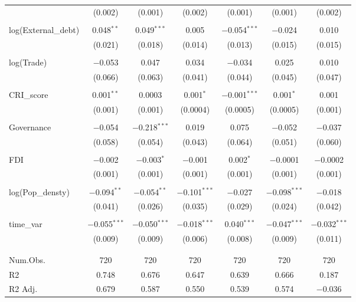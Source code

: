 \begin{table}[!htbp]
\begin{tabular}{@{\extracolsep{-3pt}}lcccccc}
  & (0.002) & (0.001) & (0.002) & (0.001) & (0.001) & (0.002) \\ 
  & & & & & & \\ 
 log(External\_debt) & 0.048$^{**}$ & 0.049$^{***}$ & 0.005 & $-$0.054$^{***}$ & $-$0.024 & 0.010 \\ 
  & (0.021) & (0.018) & (0.014) & (0.013) & (0.015) & (0.015) \\ 
  & & & & & & \\ 
 log(Trade) & $-$0.053 & 0.047 & 0.034 & $-$0.034 & 0.025 & 0.010 \\ 
  & (0.066) & (0.063) & (0.041) & (0.044) & (0.045) & (0.047) \\ 
  & & & & & & \\ 
 CRI\_score & 0.001$^{**}$ & 0.0003 & 0.001$^{*}$ & $-$0.001$^{***}$ & 0.001$^{*}$ & 0.001 \\ 
  & (0.001) & (0.001) & (0.0004) & (0.0005) & (0.0005) & (0.001) \\ 
  & & & & & & \\ 
 Governance & $-$0.054 & $-$0.218$^{***}$ & 0.019 & 0.075 & $-$0.052 & $-$0.037 \\ 
  & (0.058) & (0.054) & (0.043) & (0.064) & (0.051) & (0.060) \\ 
  & & & & & & \\ 
 FDI & $-$0.002 & $-$0.003$^{*}$ & $-$0.001 & 0.002$^{*}$ & $-$0.0001 & $-$0.0002 \\ 
  & (0.001) & (0.001) & (0.001) & (0.001) & (0.001) & (0.001) \\ 
  & & & & & & \\ 
 log(Pop\_densty) & $-$0.094$^{**}$ & $-$0.054$^{**}$ & $-$0.101$^{***}$ & $-$0.027 & $-$0.098$^{***}$ & $-$0.018 \\ 
  & (0.041) & (0.026) & (0.035) & (0.029) & (0.024) & (0.042) \\ 
  & & & & & & \\ 
 time\_var & $-$0.055$^{***}$ & $-$0.050$^{***}$ & $-$0.018$^{***}$ & 0.040$^{***}$ & $-$0.047$^{***}$ & $-$0.032$^{***}$ \\ 
  & (0.009) & (0.009) & (0.006) & (0.008) & (0.009) & (0.011) \\ 
  & & & & & & \\ 
\hline \\[-1.8ex] 
Num.Obs. & \num{720} & \num{720} & \num{720} & \num{720} & \num{720} & \num{720}\\
R2 & \num{0.748} & \num{0.676} & \num{0.647} & \num{0.639} & \num{0.666} & \num{0.187}\\
R2 Adj. & \num{0.679} & \num{0.587} & \num{0.550} & \num{0.539} & \num{0.574} & \num{-0.036}\\

\end{tabular}
\end{table}
